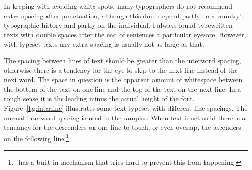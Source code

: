 \documentclass[10pt,a4paper,oneside,extrafontsizes]{memoir}%
\begin{document}
\begin{paracol}{2}
\switchEng
    In keeping with avoiding white spots, many typographers do not
recommend extra spacing after punctuation, although this does depend
partly on a country's typographic history and partly on the individual.
I always found typewritten texts with double spaces after the end
of sentences a particular eyesore. However, with typeset texts any 
extra spacing is usually not as large as that.

    The spacing between lines of text 
should be greater than the interword
spacing, otherwise there is a tendency for the eye to skip to the
next line instead of the next word. The space in question is the apparent
amount of whitespace between the bottom of the text on one line and the top
of the text on the next line. In a rough sense it is the leading minus the
actual height of the font.
Figure~\ref{fig:interline} illustrates
some text typeset with different line spacings. The normal interword
spacing is used in the samples. When text is set solid there is a tendancy
for the descenders on one line to touch, or even overlap, the ascenders on the 
following line.\footnote{\tx\ has a built-in mechanism that tries hard to 
prevent this from happening.}
\end{paracol}
\end{document}
